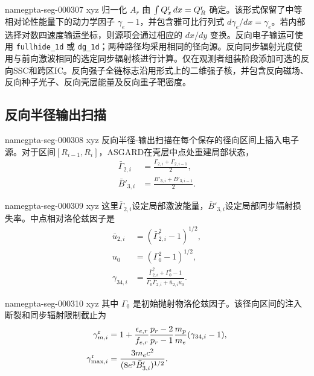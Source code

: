 \documentclass[twocolumn]{aastex702}
\makeatletter
\newcommand{\asgard}{\textsc{ASGARD}}
\providecommand{\gptareaderanchor}[1]{\pdfdest name{#1} xyz}%
\providecommand{\gptareaderanchor}[1]{\special{pdf:dest (#1) [ @thispage /XYZ @xpos @ypos null ]}}%
\makeatother
\begin{document}
\gptareaderanchor{gpta-seg-000307}%
归一化 \(A_r\) 由 \(\int Q_x^{\rm r}\,dx=Q_R^{\rm r}\) 确定。该形式保留了中等相对论性能量下的动力学因子 \(\gamma_e-1\)，并包含雅可比行列式 \(d\gamma_e/dx=\gamma_e\)。若内部选择对数四速度输运坐标，则源项会通过相应的 \(dx/dy\) 变换。反向电子输运可使用 \texttt{fullhide\_1d} 或 \texttt{dg\_1d}；两种路径均采用相同的径向源。反向同步辐射光度使用与前向激波相同的选定同步辐射核进行计算。仅在观测者组装阶段添加可选的反向SSC和跨区IC。反向强子全链标志沿用形式上的二维强子核，并包含反向磁场、反向种子光子、反向壳层能量及反向重子靶密度。

\subsection{反向半径输出扫描}


\gptareaderanchor{gpta-seg-000308}%
反向半径-输出扫描在每个保存的径向区间上插入电子源。对于区间\([R_{i-1},R_i]\)，\asgard{}在壳层中点处重建局部状态，
\begin{equation}
\begin{aligned}
\bar\Gamma_{2,i}&=\frac{\Gamma_{2,i}+\Gamma_{2,i-1}}{2},\\
\bar B'_{3,i}&=\frac{B'_{3,i}+B'_{3,i-1}}{2}.
\end{aligned}
\end{equation}

\gptareaderanchor{gpta-seg-000309}%
这里\(\bar\Gamma_{2,i}\)设定局部激波能量，\(\bar B'_{3,i}\)设定局部同步辐射损失率。中点相对洛伦兹因子是
\begin{equation}
\begin{aligned}
\bar u_{2,i}&=(\bar\Gamma_{2,i}^2-1)^{1/2},\\
u_0&=(\Gamma_0^2-1)^{1/2},\\
\gamma_{34,i}
&=\frac{\bar\Gamma_{2,i}^2+\Gamma_0^2-1}
{\Gamma_0\bar\Gamma_{2,i}+\bar u_{2,i}u_0}.
\end{aligned}
\end{equation}

\gptareaderanchor{gpta-seg-000310}%
其中 \(\Gamma_0\) 是初始抛射物洛伦兹因子。该径向区间的注入断裂和同步辐射限制截止为
\begin{equation}
\begin{aligned}
\gamma_{m,i}^{\rm r}&=
1+\frac{\epsilon_{e,r}}{f_{e,r}}
\frac{p_r-2}{p_r-1}
\frac{m_p}{m_e}(\gamma_{34,i}-1),\\
\gamma_{\max,i}^{\rm r}
&=\frac{3m_ec^2}{(8e^3\bar B'_{3,i})^{1/2}}.
\end{aligned}
\end{equation}
\end{document}
